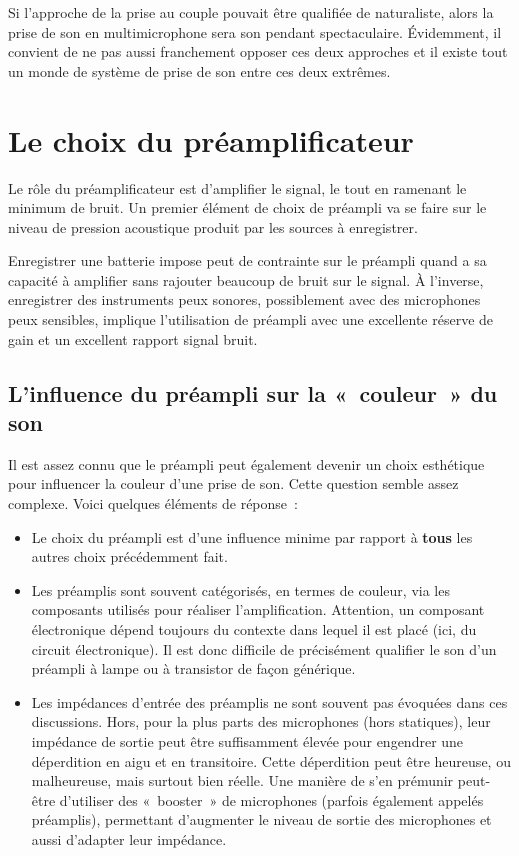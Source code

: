 \documentclass[
]{book}
\providecommand{\tightlist}{%
  \setlength{\itemsep}{0pt}\setlength{\parskip}{0pt}}
\begin{document}
Si l'approche de la prise au couple pouvait être qualifiée de naturaliste, alors la prise de son en multimicrophone sera son pendant spectaculaire. Évidemment, il convient de ne pas aussi franchement opposer ces deux approches et il existe tout un monde de système de prise de son entre ces deux extrêmes.

\hypertarget{le-choix-du-pruxe9amplificateur}{%
\section{Le choix du préamplificateur}\label{le-choix-du-pruxe9amplificateur}}

Le rôle du préamplificateur est d'amplifier le signal, le tout en ramenant le minimum de bruit. Un premier élément de choix de préampli va se faire sur le niveau de pression acoustique produit par les sources à enregistrer.

Enregistrer une batterie impose peut de contrainte sur le préampli quand a sa capacité à amplifier sans rajouter beaucoup de bruit sur le signal. À l'inverse, enregistrer des instruments peux sonores, possiblement avec des microphones peux sensibles, implique l'utilisation de préampli avec une excellente réserve de gain et un excellent rapport signal bruit.

\hypertarget{linfluence-du-pruxe9ampli-sur-la-couleur-du-son}{%
\subsection{L'influence du préampli sur la «~couleur~» du son}\label{linfluence-du-pruxe9ampli-sur-la-couleur-du-son}}

Il est assez connu que le préampli peut également devenir un choix esthétique pour influencer la couleur d'une prise de son. Cette question semble assez complexe. Voici quelques éléments de réponse~:

\begin{itemize}
\tightlist
\item
  Le choix du préampli est d'une influence minime par rapport à \textbf{tous} les autres choix précédemment fait.
\item
  Les préamplis sont souvent catégorisés, en termes de couleur, via les composants utilisés pour réaliser l'amplification. Attention, un composant électronique dépend toujours du contexte dans lequel il est placé (ici, du circuit électronique). Il est donc difficile de précisément qualifier le son d'un préampli à lampe ou à transistor de façon générique.
\item
  Les impédances d'entrée des préamplis ne sont souvent pas évoquées dans ces discussions. Hors, pour la plus parts des microphones (hors statiques), leur impédance de sortie peut être suffisamment élevée pour engendrer une déperdition en aigu et en transitoire. Cette déperdition peut être heureuse, ou malheureuse, mais surtout bien réelle. Une manière de s'en prémunir peut-être d'utiliser des «~booster~» de microphones (parfois également appelés préamplis), permettant d'augmenter le niveau de sortie des microphones et aussi d'adapter leur impédance.
\end{itemize}
\end{document}
